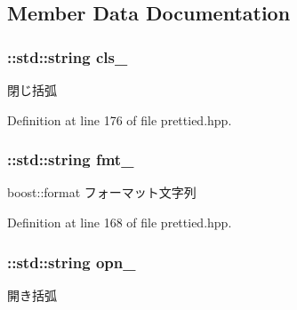 \subsection{\-Member \-Data \-Documentation}
\hypertarget{structyuh_1_1range__detail_1_1range__io_a91d9929bdbd7f866ff9823f657a36d35}{
\subsubsection[{cls\-\_\-}]{\setlength{\rightskip}{0pt plus 5cm}\-::std\-::string {\bf cls\-\_\-}}}\label{da/d75/structyuh_1_1range__detail_1_1range__io_a91d9929bdbd7f866ff9823f657a36d35}
閉じ括弧 

\-Definition at line 176 of file prettied.\-hpp.

\hypertarget{structyuh_1_1range__detail_1_1range__io_a10e6f92b15963cf8b984dcd448cb88cc}{
\subsubsection[{fmt\-\_\-}]{\setlength{\rightskip}{0pt plus 5cm}\-::std\-::string {\bf fmt\-\_\-}}}\label{da/d75/structyuh_1_1range__detail_1_1range__io_a10e6f92b15963cf8b984dcd448cb88cc}
boost\-::format フォーマット文字列 

\-Definition at line 168 of file prettied.\-hpp.

\hypertarget{structyuh_1_1range__detail_1_1range__io_a18de53e582d18b754d97ebc4c23a24f2}{
\subsubsection[{opn\-\_\-}]{\setlength{\rightskip}{0pt plus 5cm}\-::std\-::string {\bf opn\-\_\-}}}\label{da/d75/structyuh_1_1range__detail_1_1range__io_a18de53e582d18b754d97ebc4c23a24f2}
開き括弧 

